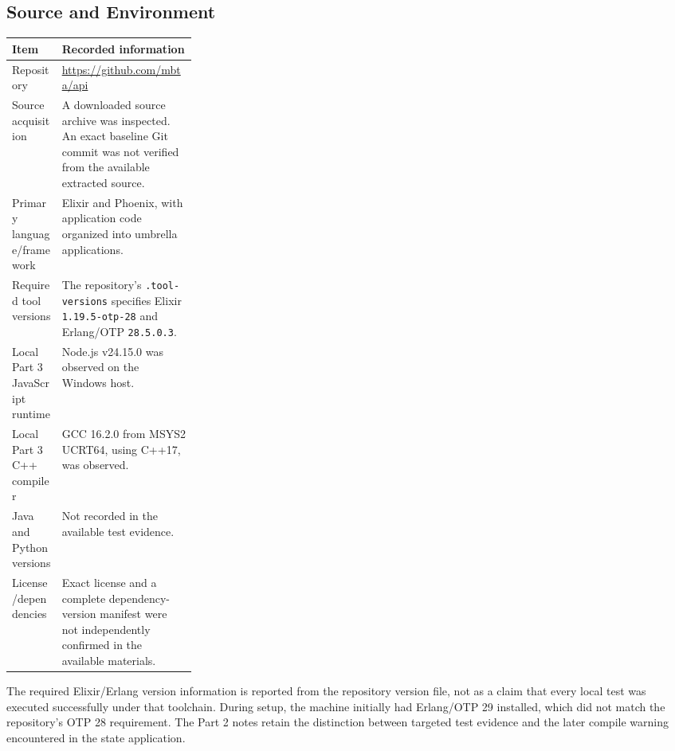 \documentclass[11pt,a4paper]{article}
\newcommand{\code}[1]{\texttt{#1}}
\begin{document}
\subsection{Source and Environment}
\begin{tabularx}{\linewidth}{@{}p{0.27\linewidth}X@{}}
\toprule Item & Recorded information\\ \midrule
Repository & \url{https://github.com/mbta/api}\\
Source acquisition & A downloaded source archive was inspected. An exact baseline Git commit was not verified from the available extracted source.\\
Primary language/framework & Elixir and Phoenix, with application code organized into umbrella applications.\\
Required tool versions & The repository's \code{.tool-versions} specifies Elixir \code{1.19.5-otp-28} and Erlang/OTP \code{28.5.0.3}.\\
Local Part 3 JavaScript runtime & Node.js v24.15.0 was observed on the Windows host.\\
Local Part 3 C++ compiler & GCC 16.2.0 from MSYS2 UCRT64, using C++17, was observed.\\
Java and Python versions & Not recorded in the available test evidence.\\
License/dependencies & Exact license and a complete dependency-version manifest were not independently confirmed in the available materials.\\
\bottomrule
\end{tabularx}

The required Elixir/Erlang version information is reported from the repository version file, not as a claim that every local test was executed successfully under that toolchain. During setup, the machine initially had Erlang/OTP 29 installed, which did not match the repository's OTP 28 requirement. The Part 2 notes retain the distinction between targeted test evidence and the later compile warning encountered in the state application.
\end{document}
